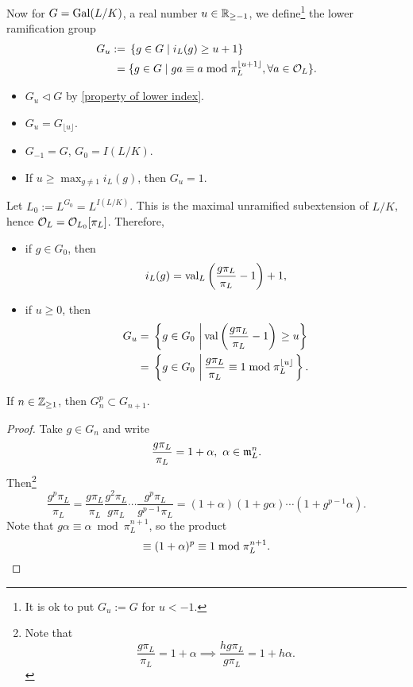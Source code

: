 Now for $G = \operatorname{Gal}(L/K)$, a real number $u\in\mathbb{R}_{\ge -1}$,
we define\footnote{It is ok to put $G_u := G$ for $u < -1$.} the lower ramification group
\begin{align*}
    G_u := {}& \left\{ g\in G\mid i_L(g)\ge u + 1 \right\}\\
    = {}& \{g\in G\mid ga \equiv a\bmod {\pi_L^{\lfloor u+1\rfloor}},\forall a\in\mathcal{O}_L\}.
\end{align*}

\begin{itemize}
    \item $G_u\vartriangleleft G$ by \cref{property of lower index}.
    \item $G_u = G_{\lfloor u\rfloor}$.
    \item $G_{-1} = G$, $G_0 = I(L/K)$.
    \item If $u\ge \max_{g\ne 1} i_L(g)$,
    then $G_u = 1$.
\end{itemize}

Let $L_0 := L^{G_0} = L^{I(L/K)}$.
This is the maximal unramified subextension of $L/K$, hence $\mathcal{O}_L = \mathcal{O}_{L_0}[\pi_L]$.
Therefore, \begin{itemize}
    \item if $g\in G_0$,
then \[i_L(g) = \operatorname{val}_L\left( \frac{g\pi_L}{\pi_L} - 1 \right) + 1,\]
    \item if $u\ge 0$, then \begin{align*}
        G_u = {}& \left\{g\in G_0\,\left|\, \operatorname{val}\left( \frac{g\pi_L}{\pi_L} - 1 \right)\right.\ge u\right\}\\
        = {}& \left\{ g\in G_0\,\left|\,
            \frac{g\pi_L}{\pi_L}\equiv 1\bmod\pi_L^{\lfloor u\rfloor}
        \right. \right\}.
    \end{align*}
\end{itemize}
\begin{lemma}
    If $n\in\mathbb{Z}_{\ge 1}$,
    then $G_n^p\subset G_{n+1}$.
\end{lemma}
\begin{proof}
    Take $g\in G_n$ and write \[\frac{g\pi_L}{\pi_L} = 1 + \alpha,\ \alpha\in\mathfrak{m}_L^n.\]
    Then\footnote{\label{lem: gx/x = 1 + a => h(gx)/gx = 1 + ha}
    Note that 
        \[\dfrac{g\pi_L}{\pi_L} = 1 + \alpha
        \implies
        \frac{hg\pi_L}{g\pi_L} = 1 + h\alpha.\]
        }
    \[\frac{g^p\pi_L }{\pi_L} = \frac{g\pi_L }{\pi_L}\frac{g^2\pi_L}{g\pi_L}\cdots\frac{g^p\pi_L}{g^{p-1}\pi_L} = (1 + \alpha)(1 + g\alpha)\cdots(1 +g^{p-1}\alpha).\]
    Note that $g\alpha\equiv\alpha\bmod\pi_L^{n+1}$,
    so the product\[\equiv (1 + \alpha)^{p}\equiv 1\bmod\pi_L^{n+1}.\qedhere\]
\end{proof}


